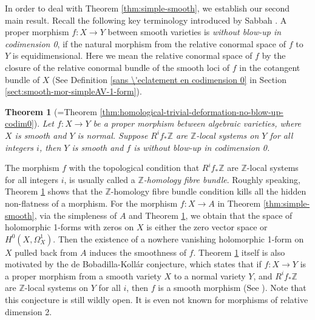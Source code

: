 \documentclass[a4paper,12pt,reqno]{amsart}
\newtheorem{theorem}{Theorem}[section]
\theoremstyle{question}
\theoremstyle{definition}
\theoremstyle{remark}
\theoremstyle{cited}
\theoremstyle{citeddef}
\begin{document}
In order to deal with Theorem \ref{thm:simple-smooth}, we establish our second main result. Recall the following key terminology introduced by Sabbah \cite[Definition 3.1]{Sab85}. A proper morphism $f\colon X\to Y$ between smooth varieties is \textit{without blow-up in codimension 0}, if the natural morphism from the relative conormal space of $f$ to $Y$ is equidimensional. Here we mean the relative conormal space of $f$ by the closure of the relative conormal bundle of the smooth loci of $f$ in the cotangent bundle of $X$ (See Definition \ref{sans  \'eclatement en codimension 0} in Section \ref{sect:smooth-mor-simpleAV-1-form}). 

\begin{theorem}[{=Theorem \ref{thm:homological-trivial-deformation-no-blow-up-codim0}}]\label{main-thm:homological-trivial-deformation-no-blow-up-codim0}
  Let $f\colon X\to Y$ be a proper morphism between algebraic varieties, where $X$ is smooth and $Y$ is normal. Suppose $R^if_*\mathbb{Z}$ are $\mathbb{Z}$-local systems on $Y$ for all integers $i$, then $Y$ is smooth and $f$ is without blow-up in codimension 0.
\end{theorem}

The morphism $f$ with the topological condition that $R^if_*\mathbb{Z}$ are $\mathbb{Z}$-local systems for all integers $i$, is usually called a \textit{$\mathbb{Z}$-homology fibre bundle}. Roughly speaking, Theorem \ref{main-thm:homological-trivial-deformation-no-blow-up-codim0} shows that the $\mathbb{Z}$-homology fibre bundle condition kills all the hidden non-flatness of a morphism. For the morphism $f\colon X\to A$ in Theorem \ref{thm:simple-smooth}, via the simpleness of $A$ and Theorem \ref{main-thm:homological-trivial-deformation-no-blow-up-codim0}, we  obtain that the space of holomorphic 1-forms with zeros on $X$ is either the zero vector space or $H^0(X, \Omega_X^1)$. Then the existence of a nowhere vanishing holomorphic 1-form on $X$ pulled back from $A$ induces the smoothness of $f$. Theorem \ref{main-thm:homological-trivial-deformation-no-blow-up-codim0} itself is also motivated by the de Bobadilla-Koll\'ar conjecture, which states that if $f\colon X\to Y$ is a proper morphism from a smooth variety $X$ to a normal variety $Y$, and $R^if_*\mathbb{Z}$ are $\mathbb{Z}$-local systems on $Y$ for all $i$, then $f$ is a smooth morphism (See \cite[Conjecture 3]{Bobadilla-Kollar2012}). Note that this conjecture is still wildly open. It is even not known for morphisms of relative dimension 2.
\end{document}
